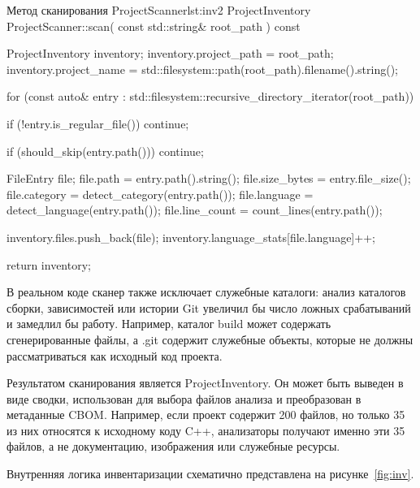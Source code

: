 \documentclass{itmo-vkr}
\begin{document}
\begin{itmolisting}[C++]{Метод сканирования ProjectScanner}{lst:inv2}
ProjectInventory ProjectScanner::scan(
const std::string& root_path
) const {
    ProjectInventory inventory;
    inventory.project_path = root_path;
    inventory.project_name =
    std::filesystem::path(root_path).filename().string();
    
    for (const auto& entry :
    std::filesystem::recursive_directory_iterator(root_path)) {
        if (!entry.is_regular_file()) {
            continue;
        }
        
        if (should_skip(entry.path())) {
            continue;
        }
        
        FileEntry file;
        file.path = entry.path().string();
        file.size_bytes = entry.file_size();
        file.category = detect_category(entry.path());
        file.language = detect_language(entry.path());
        file.line_count = count_lines(entry.path());
        
        inventory.files.push_back(file);
        inventory.language_stats[file.language]++;
    }
    
    return inventory;
}
\end{itmolisting}

В реальном коде сканер также исключает служебные каталоги: анализ каталогов сборки, зависимостей или истории Git увеличил бы число ложных срабатываний и замедлил бы работу. Например, каталог build может содержать сгенерированные файлы, а .git содержит служебные объекты, которые не должны рассматриваться как исходный код проекта.

Результатом сканирования является ProjectInventory. Он может быть выведен в виде сводки, использован для выбора файлов анализа и преобразован в метаданные CBOM. Например, если проект содержит 200 файлов, но только 35 из них относятся к исходному коду C++, анализаторы получают именно эти 35 файлов, а не документацию, изображения или служебные ресурсы.

Внутренняя логика инвентаризации схематично представлена на рисунке~\ref{fig:inv}.
\end{document}
